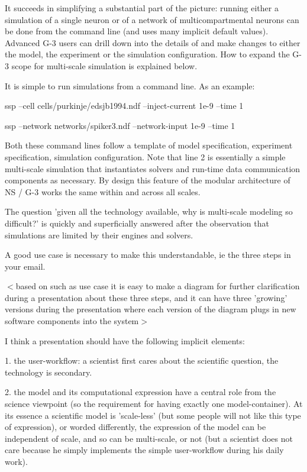 \documentclass[12pt]{article}
\begin{document}
It succeeds in simplifying a substantial part of the picture: running
either a simulation of a single neuron or of a network of
multicompartmental neurons can be done from the command line (and uses
many implicit default values).  Advanced G-3 users can drill down into
the details of and make changes to either the model, the experiment or
the simulation configuration.  How to expand the G-3 scope for
multi-scale simulation is explained below.

It is simple to run simulations from a command line.  As an example:

ssp --cell cells/purkinje/edsjb1994.ndf --inject-current 1e-9 --time 1

ssp --network networks/spiker3.ndf --network-input 1e-9 --time 1

Both these command lines follow a template of model specification,
experiment specification, simulation configuration.  Note that line 2
is essentially a simple multi-scale simulation that instantiates
solvers and run-time data communication components as necessary.  By
design this feature of the modular architecture of NS / G-3 works the
same within and across all scales.

The question 'given all the technology available, why is multi-scale
modeling so difficult?' is quickly and superficially answered after
the observation that simulations are limited by their engines and
solvers.

A good use case is necessary to make this understandable, ie the three
steps in your email.

$<$based on such as use case it is easy to make a diagram for further
clarification during a presentation about these three steps, and it
can have three 'growing' versions during the presentation where each
version of the diagram plugs in new software components into the
system$>$

I think a presentation should have the following implicit elements:

1. the user-workflow: a scientist first cares about the scientific
question, the technology is secondary.

2. the model and its computational expression have a central role from
the science viewpoint (so the requirement for having exactly one
model-container).  At its essence a scientific model is 'scale-less'
(but some people will not like this type of expression), or worded
differently, the expression of the model can be independent of scale,
and so can be multi-scale, or not (but a scientist does not care
because he simply implements the simple user-workflow during his daily
work).
\end{document}
